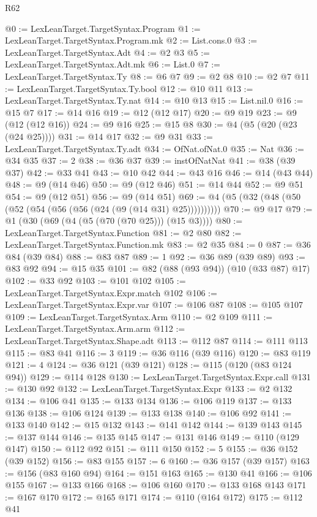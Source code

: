 \begin{lexlean}{R62}
\begin{coremodule}
@0 := LexLeanTarget.TargetSyntax.Program
@1 := LexLeanTarget.TargetSyntax.Program.mk
@2 := List.cons.{0}
@3 := LexLeanTarget.TargetSyntax.Adt
@4 := @2 @3
@5 := LexLeanTarget.TargetSyntax.Adt.mk
@6 := List.{0}
@7 := LexLeanTarget.TargetSyntax.Ty
@8 := @6 @7
@9 := @2 @8
@10 := @2 @7
@11 := LexLeanTarget.TargetSyntax.Ty.bool
@12 := @10 @11
@13 := LexLeanTarget.TargetSyntax.Ty.nat
@14 := @10 @13
@15 := List.nil.{0}
@16 := @15 @7
@17 := @14 @16
@19 := @12 (@12 @17)
@20 := @9 @19
@23 := @9 (@12 (@12 @16))
@24 := @9 @16
@25 := @15 @8
@30 := @4 (@5 (@20 (@23 (@24 @25))))
@31 := @14 @17
@32 := @9 @31
@33 := LexLeanTarget.TargetSyntax.Ty.adt
@34 := OfNat.ofNat.{0}
@35 := Nat
@36 := @34 @35
@37 := 2
@38 := @36 @37
@39 := instOfNatNat
@41 := @38 (@39 @37)
@42 := @33 @41
@43 := @10 @42
@44 := @43 @16
@46 := @14 (@43 @44)
@48 := @9 (@14 @46)
@50 := @9 (@12 @46)
@51 := @14 @44
@52 := @9 @51
@54 := @9 (@12 @51)
@56 := @9 (@14 @51)
@69 := @4 (@5 (@32 (@48 (@50 (@52 (@54 (@56 (@56 (@24 (@9 (@14 @31) @25))))))))))
@70 := @9 @17
@79 := @1 (@30 (@69 (@4 (@5 (@70 (@70 @25))) (@15 @3))))
@80 := LexLeanTarget.TargetSyntax.Function
@81 := @2 @80
@82 := LexLeanTarget.TargetSyntax.Function.mk
@83 := @2 @35
@84 := 0
@87 := @36 @84 (@39 @84)
@88 := @83 @87
@89 := 1
@92 := @36 @89 (@39 @89)
@93 := @83 @92
@94 := @15 @35
@101 := @82 (@88 (@93 @94)) (@10 (@33 @87) @17)
@102 := @33 @92
@103 := @101 @102
@105 := LexLeanTarget.TargetSyntax.Expr.match @102
@106 := LexLeanTarget.TargetSyntax.Expr.var
@107 := @106 @87
@108 := @105 @107
@109 := LexLeanTarget.TargetSyntax.Arm
@110 := @2 @109
@111 := LexLeanTarget.TargetSyntax.Arm.arm
@112 := LexLeanTarget.TargetSyntax.Shape.adt
@113 := @112 @87
@114 := @111 @113
@115 := @83 @41
@116 := 3
@119 := @36 @116 (@39 @116)
@120 := @83 @119
@121 := 4
@124 := @36 @121 (@39 @121)
@128 := @115 (@120 (@83 @124 @94))
@129 := @114 @128
@130 := LexLeanTarget.TargetSyntax.Expr.call
@131 := @130 @92
@132 := LexLeanTarget.TargetSyntax.Expr
@133 := @2 @132
@134 := @106 @41
@135 := @133 @134
@136 := @106 @119
@137 := @133 @136
@138 := @106 @124
@139 := @133 @138
@140 := @106 @92
@141 := @133 @140
@142 := @15 @132
@143 := @141 @142
@144 := @139 @143
@145 := @137 @144
@146 := @135 @145
@147 := @131 @146
@149 := @110 (@129 @147)
@150 := @112 @92
@151 := @111 @150
@152 := 5
@155 := @36 @152 (@39 @152)
@156 := @83 @155
@157 := 6
@160 := @36 @157 (@39 @157)
@163 := @156 (@83 @160 @94)
@164 := @151 @163
@165 := @130 @41
@166 := @106 @155
@167 := @133 @166
@168 := @106 @160
@170 := @133 @168 @143
@171 := @167 @170
@172 := @165 @171
@174 := @110 (@164 @172)
@175 := @112 @41

\end{coremodule}
\end{lexlean}
